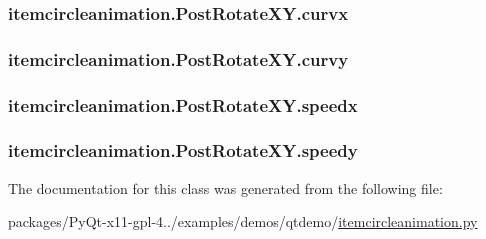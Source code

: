 \subsubsection[{curvx}]{\setlength{\rightskip}{0pt plus 5cm}itemcircleanimation.\+Post\+Rotate\+X\+Y.\+curvx}\label{classitemcircleanimation_1_1PostRotateXY_a98bc9237ea142137bd0bad58f3d0a85a}
\hypertarget{classitemcircleanimation_1_1PostRotateXY_a2c1db99c3f652677e627a9225c2954a1}{}
\subsubsection[{curvy}]{\setlength{\rightskip}{0pt plus 5cm}itemcircleanimation.\+Post\+Rotate\+X\+Y.\+curvy}\label{classitemcircleanimation_1_1PostRotateXY_a2c1db99c3f652677e627a9225c2954a1}
\hypertarget{classitemcircleanimation_1_1PostRotateXY_a143c68e26618e28ab1ac550e9cfbefeb}{}
\subsubsection[{speedx}]{\setlength{\rightskip}{0pt plus 5cm}itemcircleanimation.\+Post\+Rotate\+X\+Y.\+speedx}\label{classitemcircleanimation_1_1PostRotateXY_a143c68e26618e28ab1ac550e9cfbefeb}
\hypertarget{classitemcircleanimation_1_1PostRotateXY_aa0327e3319e99e8450f184352cc6abd7}{}
\subsubsection[{speedy}]{\setlength{\rightskip}{0pt plus 5cm}itemcircleanimation.\+Post\+Rotate\+X\+Y.\+speedy}\label{classitemcircleanimation_1_1PostRotateXY_aa0327e3319e99e8450f184352cc6abd7}


The documentation for this class was generated from the following file\+:\begin{DoxyCompactItemize}
\item 
packages/\+Py\+Qt-\/x11-\/gpl-\/4../examples/demos/qtdemo/\hyperlink{itemcircleanimation_8py}{itemcircleanimation.\+py}\end{DoxyCompactItemize}
